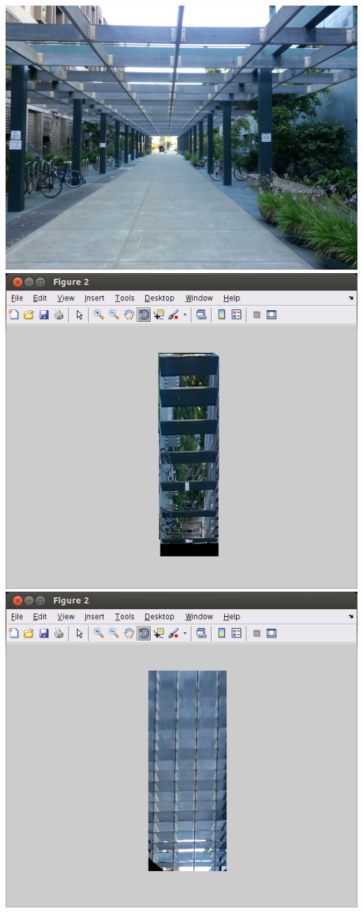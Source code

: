 \documentclass[11pt]{article}
\begin{document}
\begin{enumerate}
    \includegraphics[width=0.5\linewidth]{./../img/TIP_2.jpg}
    \includegraphics[width=0.5\linewidth]{./../img/TIP_2_columns.png}
    \includegraphics[width=0.5\linewidth]{./../img/TIP_2_rafters.png}

\end{enumerate}
\newpage
\end{document}
